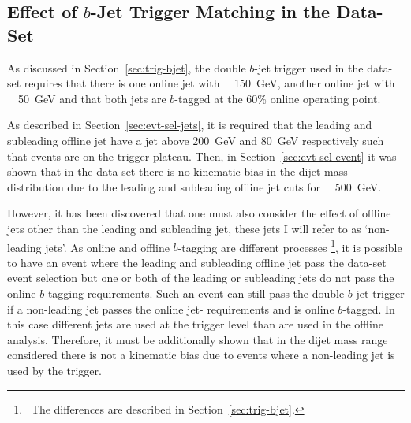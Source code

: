\subsection{Effect of $b$-Jet Trigger Matching in the \lm{} Data-Set}
\label{sec:evt-sel_btrigMatch}

As discussed in Section~\ref{sec:trig-bjet},
the double $b$-jet trigger used in the \lm{} data-set
requires that there is one online jet with \pT{}~\gt~150~GeV,
another online jet with \pT{}~\gt~50~GeV
and that both jets are $b$-tagged at the 60\% online operating point.

As described in Section~\ref{sec:evt-sel-jets}, it is required that the leading and subleading offline jet have a jet \pT{} above
200~GeV and 80~GeV respectively such that events are on the trigger plateau.
Then, in Section~\ref{sec:evt-sel-event} it was shown that in the \lm{} data-set
there is no kinematic bias in the dijet mass distribution due to the leading and subleading offline jet \pT{} cuts for \mjj{}~\gt{}~500~GeV.

However, it has been discovered that one must also consider the effect of offline jets other than the leading and subleading jet,
these jets I will refer to as `non-leading jets'.
As online and offline $b$-tagging are different processes \footnote{\ The differences are described in Section~\ref{sec:trig-bjet}.},
it is possible to have an event where the leading and subleading offline jet pass the \lm{} data-set event selection
but one or both of the leading or subleading jets do not pass the online $b$-tagging requirements.
Such an event can still pass the double $b$-jet trigger if  a non-leading jet
passes the online jet-\pT{} requirements and is online $b$-tagged.
In this case different jets are used at the trigger level than are used in the offline analysis.
Therefore, it must be additionally shown that in the dijet mass range considered there is not a kinematic bias
due to events where a non-leading jet is used by the trigger.

